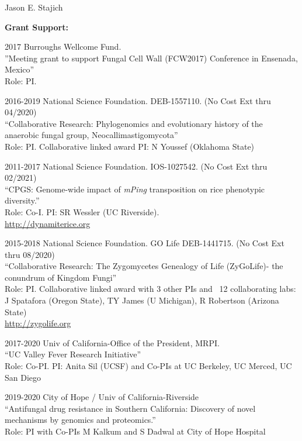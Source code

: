 \documentclass[10pt]{article}
\begin{document}
\begin{cv}{\centerline{Jason E. Stajich}}
\begin{cvlistcompact}{\bf Grant Support:}
\item [2017] Burroughs Wellcome Fund. \\
''Meeting grant to support Fungal Cell Wall (FCW2017) Conference in Ensenada, Mexico'' \\
Role: PI.

\item [2016-2019] National Science Foundation. DEB-1557110. (No Cost Ext thru 04/2020) \\
``Collaborative Research: Phylogenomics and evolutionary history of the anaerobic fungal group, Neocallimastigomycota'' \\
Role: PI. Collaborative linked award PI: N Youssef (Oklahoma State)

\item [2011-2017] National Science Foundation. IOS-1027542.  (No Cost Ext thru 02/2021) \\
  ``CPGS: Genome-wide impact of \textit{mPing} transposition on rice phenotypic diversity.'' \\
Role: Co-I. PI: SR Wessler (UC Riverside). \\
\url{http://dynamiterice.org}

\item [2015-2018] National Science Foundation. GO Life DEB-1441715. (No Cost Ext thru 08/2020) \\
``Collaborative Research: The Zygomycetes Genealogy of Life
  (ZyGoLife)- the conundrum of Kingdom Fungi'' \\
  Role: PI. Collaborative linked award with 3 other PIs and ~12
  collaborating labs: J Spatafora (Oregon State), TY James (U
  Michigan), R Robertson (Arizona State) \\
\url{http://zygolife.org}

\item [2017-2020] Univ of California-Office of the President, MRPI. \\
``UC Valley Fever Research Initiative'' \\
Role: Co-PI.  PI: Anita Sil (UCSF) and Co-PIs at UC Berkeley, UC Merced,
UC San Diego

\item [2019-2020] City of Hope / Univ of California-Riverside \\
``Antifungal drug resistance in Southern California: Discovery of
  novel mechanisms by genomics and proteomics.'' \\
Role: PI with Co-PIs M Kalkum and S Dadwal at City of Hope Hospital


\end{cvlistcompact}
\end{cv}
\end{document}
